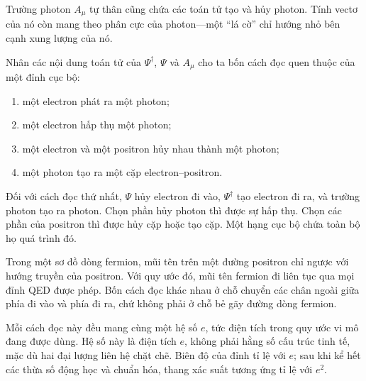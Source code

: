 Trường photon \(A_\mu\) tự thân cũng chứa các toán tử tạo và hủy photon. Tính vectơ của nó còn mang theo phân cực của photon---một ``lá cờ'' chỉ hướng nhỏ bên cạnh xung lượng của nó.

\begin{classroomqa}
\end{classroomqa}

Nhân các nội dung toán tử của \(\Psi^\dagger\), \(\Psi\) và \(A_\mu\) cho ta bốn cách đọc quen thuộc của một đỉnh cục bộ:
\begin{enumerate}
\item một electron phát ra một photon;
\item một electron hấp thụ một photon;
\item một electron và một positron hủy nhau thành một photon;
\item một photon tạo ra một cặp electron--positron.
\end{enumerate}
Đối với cách đọc thứ nhất, \(\Psi\) hủy electron đi vào, \(\Psi^\dagger\) tạo electron đi ra, và trường photon tạo ra photon. Chọn phần hủy photon thì được sự hấp thụ. Chọn các phần của positron thì được hủy cặp hoặc tạo cặp. Một hạng cục bộ chứa toàn bộ họ quá trình đó.

Trong một sơ đồ dòng fermion, mũi tên trên một đường positron chỉ ngược với hướng truyền của positron. Với quy ước đó, mũi tên fermion đi liên tục qua mọi đỉnh QED được phép. Bốn cách đọc khác nhau ở chỗ chuyển các chân ngoài giữa phía đi vào và phía đi ra, chứ không phải ở chỗ bẻ gãy đường dòng fermion.

Mỗi cách đọc này đều mang cùng một hệ số \(e\), tức điện tích trong quy ước vi mô đang được dùng. Hệ số này là điện tích \(e\), không phải hằng số cấu trúc tinh tế, mặc dù hai đại lượng liên hệ chặt chẽ. Biên độ của đỉnh tỉ lệ với \(e\); sau khi kể hết các thừa số động học và chuẩn hóa, thang xác suất tương ứng tỉ lệ với \(e^2\).

\begin{classroomqa}
\end{classroomqa}

